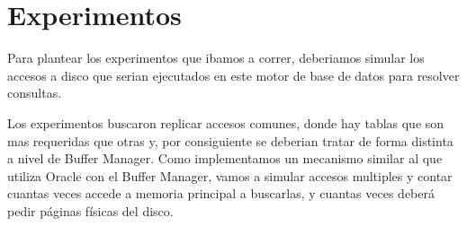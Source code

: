 \section{Experimentos}


Para plantear los experimentos que ibamos a correr, deberiamos simular los accesos a disco que serian ejecutados
en este motor de base de datos para resolver consultas.

Los experimentos buscaron replicar accesos comunes, donde hay tablas que son mas requeridas que otras y, por
consiguiente se deberian tratar de forma distinta a nivel de Buffer Manager. Como implementamos un mecanismo
similar al que utiliza Oracle con el Buffer Manager, vamos a simular accesos multiples y contar cuantas veces
accede a memoria principal a buscarlas, y cuantas veces deber\'a pedir p\'aginas f\'isicas del disco.


